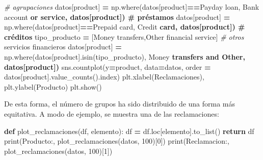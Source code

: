 \documentclass[
  a4paper,
  DIV=11,
  numbers=noendperiod]{scrreprt}
\newenvironment{Shaded}{\begin{snugshade}}{\end{snugshade}}
\newcommand{\BuiltInTok}[1]{#1}
\newcommand{\CommentTok}[1]{\textcolor[rgb]{0.56,0.35,0.01}{\textit{#1}}}
\newcommand{\ControlFlowTok}[1]{\textcolor[rgb]{0.13,0.29,0.53}{\textbf{#1}}}
\newcommand{\DecValTok}[1]{\textcolor[rgb]{0.00,0.00,0.81}{#1}}
\newcommand{\ErrorTok}[1]{\textcolor[rgb]{0.64,0.00,0.00}{\textbf{#1}}}
\newcommand{\KeywordTok}[1]{\textcolor[rgb]{0.13,0.29,0.53}{\textbf{#1}}}
\newcommand{\NormalTok}[1]{#1}
\newcommand{\OperatorTok}[1]{\textcolor[rgb]{0.81,0.36,0.00}{\textbf{#1}}}
\newcommand{\StringTok}[1]{\textcolor[rgb]{0.31,0.60,0.02}{#1}}
\begin{document}
\begin{Shaded}
\begin{Highlighting}[numbers=left,,]
\CommentTok{\# agrupaciones}
\NormalTok{datos[}\StringTok{\textquotesingle{}product\textquotesingle{}}\NormalTok{] }\OperatorTok{=}\NormalTok{ np.where(datos[}\StringTok{\textquotesingle{}product\textquotesingle{}}\NormalTok{]}\OperatorTok{==}\StringTok{\textquotesingle{}Payday loan\textquotesingle{}}\NormalTok{, }\StringTok{\textquotesingle{}Bank account}
\ErrorTok{or service\textquotesingle{}, datos[\textquotesingle{}product\textquotesingle{}]) \# préstamos}
\NormalTok{datos[}\StringTok{\textquotesingle{}product\textquotesingle{}}\NormalTok{] }\OperatorTok{=}\NormalTok{ np.where(datos[}\StringTok{\textquotesingle{}product\textquotesingle{}}\NormalTok{]}\OperatorTok{==}\StringTok{\textquotesingle{}Prepaid card\textquotesingle{}}\NormalTok{, }\StringTok{\textquotesingle{}Credit}
\ErrorTok{card\textquotesingle{}, datos[\textquotesingle{}product\textquotesingle{}]) \# créditos}
\NormalTok{tipo\_producto }\OperatorTok{=}\NormalTok{ [}\StringTok{\textquotesingle{}Money transfers\textquotesingle{}}\NormalTok{,}\StringTok{\textquotesingle{}Other financial service\textquotesingle{}}\NormalTok{] }\CommentTok{\# otros}
\NormalTok{servicios financieros}
\NormalTok{datos[}\StringTok{\textquotesingle{}product\textquotesingle{}}\NormalTok{] }\OperatorTok{=}\NormalTok{ np.where(datos[}\StringTok{\textquotesingle{}product\textquotesingle{}}\NormalTok{].isin(tipo\_producto), }\StringTok{\textquotesingle{}Money}
\ErrorTok{transfers and Other\textquotesingle{}, datos[\textquotesingle{}product\textquotesingle{}])}
\NormalTok{sns.countplot(y}\OperatorTok{=}\StringTok{\textquotesingle{}product\textquotesingle{}}\NormalTok{, data}\OperatorTok{=}\NormalTok{datos, order }\OperatorTok{=}
\NormalTok{datos[}\StringTok{\textquotesingle{}product\textquotesingle{}}\NormalTok{].value\_counts().index)}
\NormalTok{plt.xlabel(}\StringTok{\textquotesingle{}Reclamaciones\textquotesingle{}}\NormalTok{), plt.ylabel(}\StringTok{\textquotesingle{}Producto\textquotesingle{}}\NormalTok{)}
\NormalTok{plt.show()}
\end{Highlighting}
\end{Shaded}

De esta forma, el número de grupos ha sido distribuido de una forma más
equitativa. A modo de ejemplo, se muestra una de las reclamaciones:

\begin{Shaded}
\begin{Highlighting}[numbers=left,,]
\KeywordTok{def}\NormalTok{ plot\_reclamaciones(df, elemento):}
\NormalTok{    df }\OperatorTok{=}\NormalTok{ df.loc[elemento].to\_list()}
    \ControlFlowTok{return}\NormalTok{ df}
\BuiltInTok{print}\NormalTok{(}\StringTok{\textquotesingle{}Producto:\textquotesingle{}}\NormalTok{, plot\_reclamaciones(datos, }\DecValTok{100}\NormalTok{)[}\DecValTok{0}\NormalTok{])}
\BuiltInTok{print}\NormalTok{(}\StringTok{\textquotesingle{}Reclamacion:\textquotesingle{}}\NormalTok{, plot\_reclamaciones(datos, }\DecValTok{100}\NormalTok{)[}\DecValTok{1}\NormalTok{])}
\end{Highlighting}
\end{Shaded}
\end{document}
